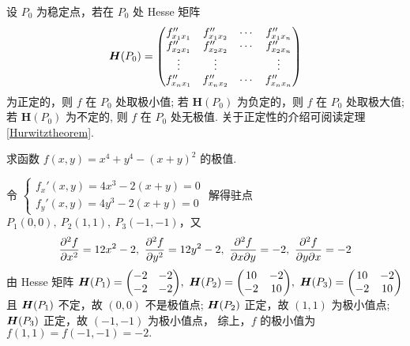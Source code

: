 \begin{theorem}
    设 $ P_{0} $ 为稳定点，若在 $ P_{0} $ 处 Hesse 矩阵
    $$\vb*{H}(P_0)=\mqty(f_{x_{1} x_{1}}^{\prime \prime} & f_{x_{1} x_{2}}^{\prime \prime} & \cdots & f_{x_{1} x_{n}}^{\prime \prime} \\
        f_{x_{2} x_{1}}^{\prime \prime} & f_{x_{2} x_{2}}^{\prime \prime} & \cdots & f_{x_{2} x_{n}}^{\prime \prime} \\
        \vdots & \vdots & & \vdots \\
        f_{x_{n} x_{1}}^{\prime \prime} & f_{x_{n} x_{2}}^{\prime \prime} & \cdots & f_{x_{n} x_{n}}^{\prime \prime})$$
    为正定的，则 $ f $ 在 $ P_{0} $ 处取极小值; 若 $ \boldsymbol{H}\left(P_{0}\right) $ 为负定的，则 $ f $ 在 $ P_{0} $ 处取极大值; 
    若 $ \boldsymbol{H}\left(P_{0}\right) $ 为不定的, 则 $ f $ 在 $ P_{0} $ 处无极值. 关于正定性的介绍可阅读定理 \ref{Hurwitztheorem}.
\end{theorem}

\begin{example}
    求函数 $f(x,y)=x^4+y^4-(x+y)^2$ 的极值.
\end{example}
\begin{solution}
    令 $\begin{cases}
        f_x'(x,y)=4x^3-2(x+y)=0\\
        f_y'(x,y)=4y^3-2(x+y)=0
    \end{cases}$ 解得驻点 $P_1(0,0),~P_2(1,1),~P_3(-1,-1)$，又 
    $$\displaystyle \pdv[2]{f}{x}=12x^2-2,~\pdv[2]{f}{y}=12y^2-2,~\pdv{f}{x}{y}=-2,~\pdv{f}{y}{x}=-2$$
    由 Hesse 矩阵 $\vb*{H}(P_1)=\mqty(-2&-2\\-2&-2),~\vb*{H}(P_2)=\mqty(10&-2\\-2&10),~\vb*{H}(P_3)=\mqty(10&-2\\-2&10)$ 且 $\vb*{H}(P_1)$ 不定，故 $(0,0)$ 不是极值点; 
    $\vb*{H}(P_2)$ 正定，故 $(1,1)$ 为极小值点; $\vb*{H}(P_3)$ 正定，故 $(-1,-1)$ 为极小值点，
    综上，$f$ 的极小值为 $f(1,1)=f(-1,-1)=-2.$
\end{solution}

